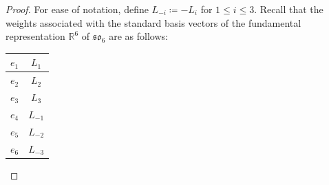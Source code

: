 \documentclass[pdftex]{sigma}
\numberwithin{equation}{section}
\theoremstyle{definition}
\begin{document}
\begin{proof}
 For ease of notation, define $L_{-i} \coloneqq -L_i$ for $1 \le i \le 3$. Recall that the weights associated with the standard basis vectors of the fundamental representation $\mathbb{R}^6$ of $\mathfrak{so}_6$ are as follows:
 \begin{center}
 \begin{tabular}{|c|c|}
 \hline
 $e_1$ & $L_1$ \\
 \hline
 $e_2$ & $L_2$ \\
 \hline
 $e_3$ & $L_3$ \\
 \hline
 $e_4$ & $L_{-1}$ \\
 \hline
 $e_5$ & $L_{-2}$ \\
 \hline
 $e_6$ & $L_{-3}$ \\
 \hline
 \end{tabular}
 \end{center}


\end{proof}
\end{document}
